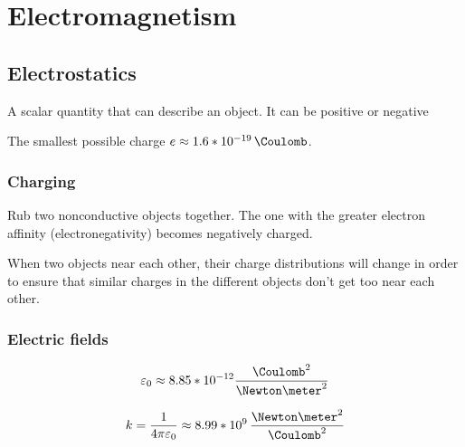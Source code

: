 \chapter{Electromagnetism}

\section{Electrostatics}

\begin{definition} A scalar quantity that can describe an object. It can be positive or negative
\end{definition}

\begin{definition} The smallest possible charge $e \approx 1.6 * 10^{-19} \, \Coulomb$.
\end{definition}

\subsection{Charging}

\begin{procedure} Rub two nonconductive objects together. The one with the greater electron affinity (electronegativity) becomes negatively charged.
\end{procedure}

\begin{procedure}[Polarization] When two objects near each other, their charge distributions will change in order to ensure that similar charges in the different objects don't get too near each other.
\end{procedure}


\subsection{Electric fields}

\begin{definition}
  \[
    \varepsilon_0 \approx 8.85 * 10^{-12} \frac{\Coulomb^2}{\Newton \meter^2}
  \]
\end{definition}

\begin{definition}
  \[
    k = \frac{1}{4\pi\varepsilon_0} \approx 8.99 * 10^9 \, \frac{\Newton \meter^2}{\Coulomb^2}
  \]
\end{definition}

